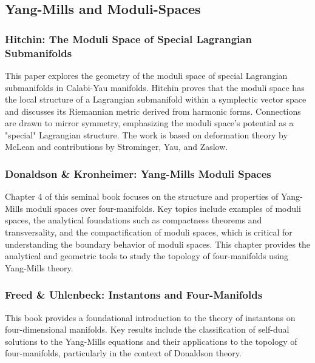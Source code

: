 \documentclass[10pt, letterpaper]{article}
\theoremstyle{custom}
\theoremstyle{definition}
\begin{document}
\vspace{1cm}








\subsection{Yang-Mills and Moduli-Spaces}

\subsubsection{Hitchin: The Moduli Space of Special Lagrangian Submanifolds \cite{hitchin1997moduli}} 
This paper explores the geometry of the moduli space of special Lagrangian submanifolds in Calabi-Yau manifolds. Hitchin proves that the moduli space has the local structure of a Lagrangian submanifold within a symplectic vector space and discusses its Riemannian metric derived from harmonic forms. Connections are drawn to mirror symmetry, emphasizing the moduli space's potential as a "special" Lagrangian structure. The work is based on deformation theory by McLean and contributions by Strominger, Yau, and Zaslow.




\subsubsection{Donaldson \& Kronheimer: Yang-Mills Moduli Spaces \cite{donaldson1990geometry}} 
Chapter 4 of this seminal book focuses on the structure and properties of Yang-Mills moduli spaces over four-manifolds. Key topics include examples of moduli spaces, the analytical foundations such as compactness theorems and transversality, and the compactification of moduli spaces, which is critical for understanding the boundary behavior of moduli spaces. This chapter provides the analytical and geometric tools to study the topology of four-manifolds using Yang-Mills theory.

\subsubsection{Freed \& Uhlenbeck: Instantons and Four-Manifolds \cite{freed1984instantons}} 
This book provides a foundational introduction to the theory of instantons on four-dimensional manifolds. Key results include the classification of self-dual solutions to the Yang-Mills equations and their applications to the topology of four-manifolds, particularly in the context of Donaldson theory.
\end{document}
